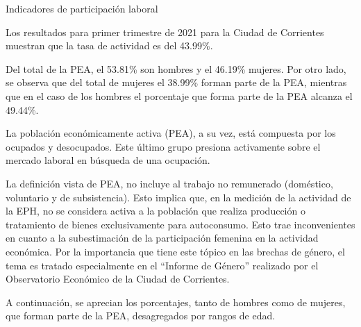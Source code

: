 \documentclass{article}
\begin{document}
\newpage


\textcolor{graycustom}{\Large Indicadores de participación laboral} \newline

Los resultados para primer trimestre de 2021 para la Ciudad de
Corrientes muestran que la tasa de actividad es del 43.99\%.

Del total de la PEA, el 53.81\% son hombres y el 46.19\% mujeres. Por
otro lado, se observa que del total de mujeres el 38.99\% forman parte
de la PEA, mientras que en el caso de los hombres el porcentaje que
forma parte de la PEA alcanza el 49.44\%.

La población económicamente activa (PEA), a su vez, está compuesta por
los ocupados y desocupados. Este último grupo presiona activamente sobre
el mercado laboral en búsqueda de una ocupación.

La definición vista de PEA, no incluye al trabajo no remunerado
(doméstico, voluntario y de subsistencia). Esto implica que, en la
medición de la actividad de la EPH, no se considera activa a la
población que realiza producción o tratamiento de bienes exclusivamente
para autoconsumo. Esto trae inconvenientes en cuanto a la subestimación
de la participación femenina en la actividad económica. Por la
importancia que tiene este tópico en las brechas de género, el tema es
tratado especialmente en el ``Informe de Género'' realizado por el
Observatorio Económico de la Ciudad de Corrientes.

A continuación, se aprecian los porcentajes, tanto de hombres como de
mujeres, que forman parte de la PEA, desagregados por rangos de edad.
\end{document}
